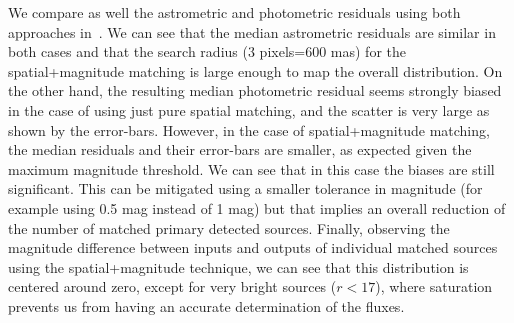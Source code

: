 \documentclass[twocolumn]{aastex62}
\begin{document}
We compare as well the astrometric and photometric residuals using both approaches in~. We can see that the median astrometric residuals are similar in both cases and that the search radius (3 pixels=600 mas) for the spatial+magnitude matching is large enough to map the overall distribution. On the other hand, the resulting median photometric residual seems strongly biased in the case of using just pure spatial matching, and the scatter is very large as shown by the error-bars. However, in the case of spatial+magnitude matching, the median residuals and their error-bars are smaller, as expected given the maximum magnitude threshold. We can see that in this case the biases are still significant. This can be mitigated using a smaller tolerance in magnitude (for example using 0.5 mag instead of 1 mag) but that implies an overall reduction of the number of matched primary detected sources. Finally, observing the magnitude difference between inputs and outputs of individual matched sources using the spatial+magnitude technique, we can see that this distribution is centered around zero, except for very bright sources ($r < 17$), where saturation prevents us from having an accurate determination of the fluxes. 
\end{document}
